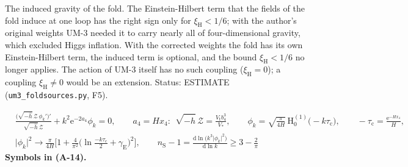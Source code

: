 \documentclass[
  10pt,
]{article}
\begin{document}
The induced gravity of the fold. The Einstein-Hilbert term that the
fields of the fold induce at one loop has the right sign only for
\(\xi_{\mathrm{H}} < 1/6\); with the author's original weights UM-3
needed it to carry nearly all of four-dimensional gravity, which
excluded Higgs inflation. With the corrected weights the fold has its
own Einstein-Hilbert term, the induced term is optional, and the bound
\(\xi_{\mathrm{H}} < 1/6\) no longer applies. The action of UM-3 itself
has no such coupling (\(\xi_{\mathrm{H}} = 0\)); a coupling
\(\xi_{\mathrm{H}} \ne 0\) would be an extension. Status: ESTIMATE
(\texttt{um3\_foldsources.py}, F5).

\[
\begin{aligned}
&\frac{\big(\sqrt{-\hat h}\,\mathcal{Z}\,\phi_k'\big)'}{\sqrt{-\hat h}\,\mathcal{Z}} + k^2\mathrm{e}^{-2a_4}\phi_k = 0,\qquad
 a_4 = Hx_4:\ \ \sqrt{-\hat h}\,\mathcal{Z} = \frac{V_{\mathrm{t}}b_4^3}{V_*},\qquad
 \phi_k = \sqrt{\frac{\pi}{4H}}\,\mathrm{H}^{(1)}_0\big(-k\tau_{\mathrm{c}}\big),\qquad -\tau_{\mathrm{c}} = \frac{\mathrm{e}^{-Hx_4}}{H},\\
&\lvert\phi_k\rvert^2 \to \frac{\pi}{4H}\Big[1 + \frac{4}{\pi^2}\Big(\ln\frac{-k\tau_{\mathrm{c}}}{2} + \gamma_{\mathrm{E}}\Big)^2\Big],\qquad
 n_{\mathrm{S}} - 1 = \frac{\mathrm{d}\ln\big(k^3\lvert\phi_k\rvert^2\big)}{\mathrm{d}\ln k} \ge 3 - \frac{2}{\pi}
\end{aligned} \tag{A-14}
\] \textbf{Symbols in (A-14).}
\end{document}
